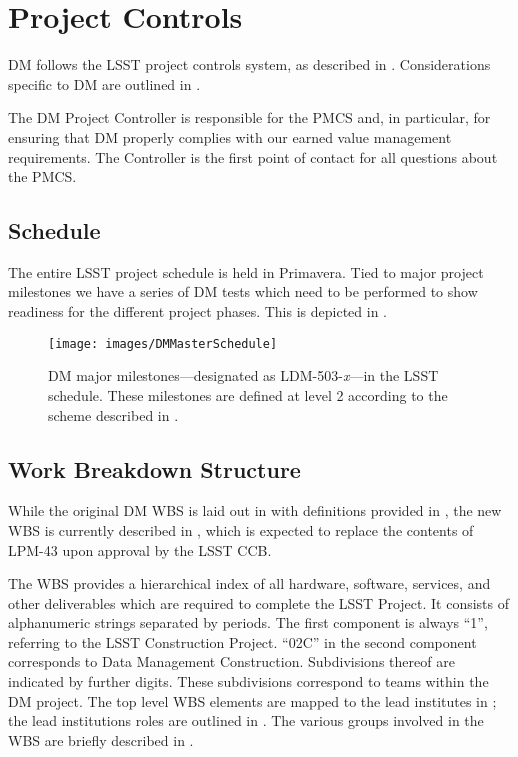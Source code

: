 \newpage
\section{Project Controls}\label{sect:dmpc}

DM follows the LSST project controls system, as described in .
Considerations specific to DM are outlined in .

The DM Project Controller is responsible for the PMCS and, in particular, for ensuring that DM properly complies with our earned value management requirements.
The Controller is the first point of contact for all questions about the PMCS.

\subsection{Schedule}\label{sect:schedule}

The entire LSST project schedule is held in Primavera.
Tied to major project milestones we have a series of DM tests which need to be performed to show readiness for the different project phases.
This is depicted in .

\begin{figure}[htbp]
	\begin{center}
		 \texttt{[image: images/DMMasterSchedule]}
		 \caption{DM major milestones---designated as LDM-503-\textit{x}---in
         the LSST schedule. These milestones are defined at level 2 according
         to the scheme described in .}
         \label{fig:schedule}
	 \end{center}
 \end{figure}

\subsection{Work Breakdown Structure}\label{sect:WBS}

While the original DM WBS is laid out in  with definitions provided in ,
the new WBS is currently described in , which is expected to replace the contents of LPM-43 upon approval by the LSST CCB.

The WBS provides a hierarchical index of all hardware, software, services, and other deliverables which are required to complete the LSST Project.
It consists of alphanumeric strings separated by periods.
The first component is always “1”, referring to the LSST Construction Project.
``02C'' in the second component corresponds to Data Management Construction.
Subdivisions thereof are indicated by further digits.
These subdivisions correspond to teams within the DM project.
The top level WBS elements are mapped to the lead institutes in ; the lead institutions roles are outlined in .
The various groups involved in the WBS are briefly described in .

